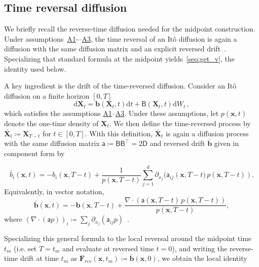 \documentclass[
 longbibliography,
 twocolumn,
 superscriptaddress,
 amsmath,
 amssymb,
 amsthm,
 amsfonts,
 prl,
 floatfix,
]{revtex4-2}
\newcommand{\matbf}[1]{\boldsymbol{\mathsf{#1}}}
\begin{document}
\begin{widetext}
\subsection{Time reversal diffusion}
\vspace*{-0.5\baselineskip}
We briefly recall the reverse-time diffusion needed for the midpoint construction. Under assumptions~\hyperlink{assumption:A1}{A1}-–\hyperlink{assumption:A3}{A3}, the time reversal of an It\^{o} diffusion is again a diffusion with the same diffusion matrix and an explicit reversed drift~\cite{anderson1982reverse,haussmann1986time}. Specializing that standard formula at the midpoint yields~\eqref{seq:get_v}, the identity used below.

A key ingredient is the drift of the time-reversed diffusion. Consider an It\^{o} diffusion on a finite horizon $\left[0, T\right]$
\begin{equation*}
    \mathrm{d}\bm{X}_t=\bm{b}(\bm{X}_t,t)\mathrm{d}t+\matbf{B}(\bm{X}_t,t)\mathrm{d}W_t\,,
\end{equation*}
which satisfies the assumptions \hyperlink{assumption:A1}{A1}--\hyperlink{assumption:A3}{A3}.
Under these assumptions, let $p(\bm{x}, t)$ denote the one-time density of $\bm{X}_t$. 
We then define the time-reversed process by $\bar{\bm{X}}_t \coloneq \bm{X}_{T-t}$ for $t \in [0, T]$. 
With this definition, $\bar{\bm{X}}_t$ is again a diffusion process with the same diffusion matrix $\matbf{a}\coloneq\matbf{B}\matbf{B}^\intercal=2\matbf{D}$ and reversed drift $\bar{\bm{b}}$ given in component form by

\begin{equation}
    \bar{b}_i(\bm{x}, t)=
    -b_i(\bm{x},T-t)+
    \frac{1}{p(\bm{x},T-t)}
    \sum_{j=1}^d
    \partial_{x_j}(\mathsf{a}_{ij}\left(\bm{x},T-t)\,p(\bm{x},T-t)\right).
    \label{seq:def_reversed_drift}
\end{equation}
Equivalently, in vector notation,
\begin{equation*}
    \bar{\bm{b}}(\bm{x}, t)=
    -\bm{b}(\bm{x},T-t)+
    \frac{
    \nabla\cdot\left(
    \matbf{a}(\bm{x},T-t)\,p(\bm{x},T-t)
    \right)
    }{p(\bm{x},T-t)},
    \label{seq:def_reversed_drift_vec}
\end{equation*}
where $(\nabla\cdot(\matbf{a}p))_i\coloneq\sum_j\partial_{x_j}(\mathsf{a}_{ij}p)$~\cite{haussmann1986time}.

Specializing this general formula to the local reversal around the midpoint time $t_m$ (i.e. set $T=t_m$ and evaluate at reversed time $t=0$), and writing the reverse-time drift at time $t_m$ as $\bm{F}_{rev}(\bm{x},t_m)\coloneq\bar{\bm{b}}(\bm{x},0)$, we obtain the local identity


\end{widetext}
\end{document}
